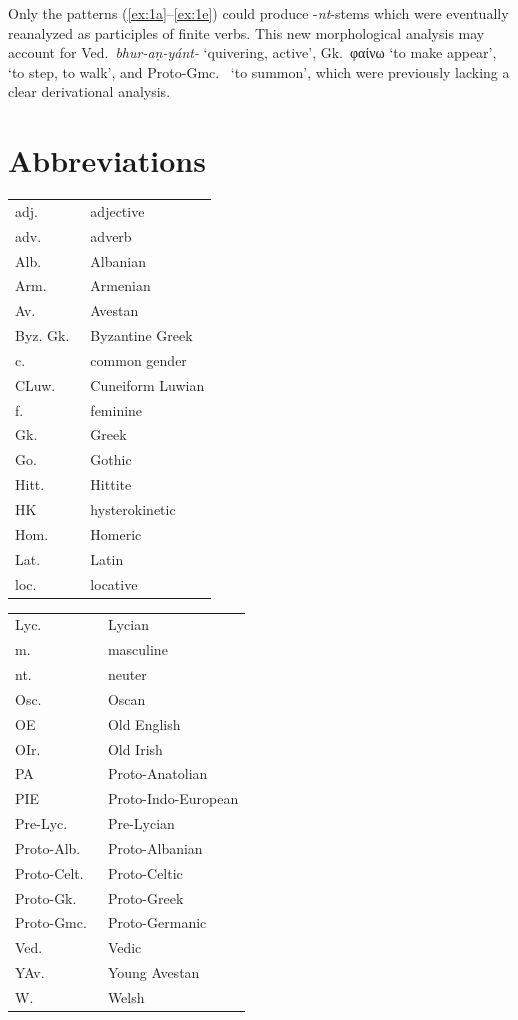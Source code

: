 \documentclass[output=paper,colorlinks,citecolor=brown]{langscibook}
\begin{document}
Only the patterns (\ref{ex:1a}--\ref{ex:1e}) could produce -\textit{nt}-stems  which were eventually reanalyzed as participles of finite verbs. This new morphological analysis may account for Ved.\ \textit{bhur-aṇ-yánt-}   ‘quivering, active’, Gk.\ φαίνω ‘to make appear’,  ‘to step, to walk’, and Proto-Gmc.\  ‘to summon’, which were previously lacking a clear derivational analysis.

\section*{Abbreviations}

\begin{tabularx}{.45\textwidth}{lQ}
adj.&  adjective \\
 adv. & adverb \\
 Alb.\ & Albanian \\
 Arm.\ & Armenian \\
 Av.\ & Avestan \\
Byz. Gk.\ & Byzantine Greek \\
 c. & common gender \\
 CLuw.\ & Cuneiform Luwian \\
 f. & feminine \\
 Gk.\ & Greek\\
 Go.\ & Gothic \\
 Hitt.\ & Hittite \\
 HK & hysterokinetic \\
 Hom.\ & Homeric \\
 Lat.\ & Latin \\
 loc. & locative \\
 \end{tabularx}
\begin{tabularx}{.5\textwidth}{lQ}
 Lyc.\ & Lycian\\
  m. & masculine\\
  nt. & neuter\\
  Osc. & Oscan\\
  OE & Old English\\
  OIr.\ & Old Irish\\
 PA & Proto-Anatolian\\
  PIE & Proto-Indo-European\\
   Pre-Lyc.\ & Pre-Lycian\\
  Proto-Alb.\ & Proto-Albanian\\
  Proto-Celt.\ & Proto-Celtic\\
   Proto-Gk.\ & Proto-Greek\\
  Proto-Gmc.\ & Proto-Germanic\\
 Ved.\ & Vedic\\
 YAv.\ & Young Avestan\\
 W. & Welsh\\
 \end{tabularx}




\sloppy\printbibliography[heading=subbibliography,notkeyword=this]
\end{document}
